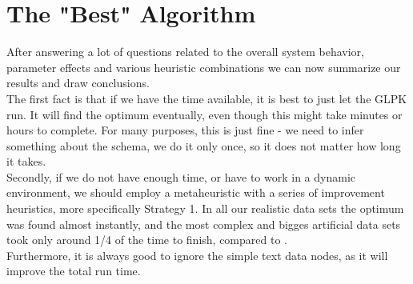 \section{The "Best" Algorithm}

After answering a lot of questions related to the overall system behavior, parameter effects and various heuristic combinations we can now summarize our results and draw conclusions.\\

The first fact is that if we have the time available, it is best to just let the GLPK run. It will find the optimum eventually, even though this might take minutes or hours to complete. For many purposes, this is just fine - we need to infer something about the schema, we do it only once, so it does not matter how long it takes.\\

Secondly, if we do not have enough time, or have to work in a dynamic environment, we should employ a metaheuristic with a series of improvement heuristics, more specifically Strategy 1. In all our realistic data sets the optimum was found almost instantly, and the most complex and bigges artificial data sets took only around 1/4 of the time to finish, compared to .\\

Furthermore, it is always good to ignore the simple text data nodes, as it will improve the total run time.